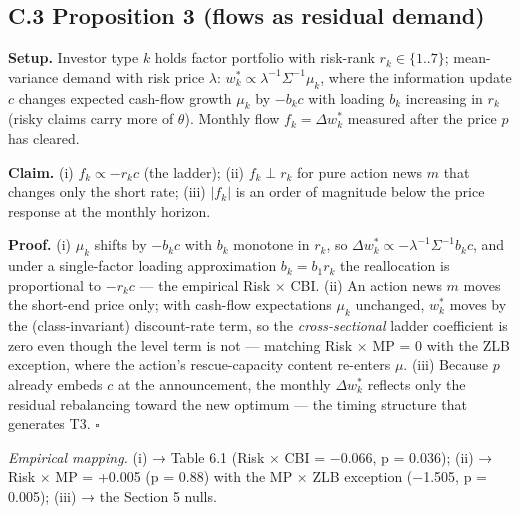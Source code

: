 \subsection{C.3 Proposition 3 (flows as residual demand)}\label{c.3-proposition-3-flows-as-residual-demand}

\textbf{Setup.} Investor type \(k\) holds factor portfolio with risk-rank \(r_k \in \{1..7\}\); mean-variance demand with risk price \(\lambda\): \(w_k^* \propto \lambda^{-1} \Sigma^{-1} \mu_k\), where the information update \(c\) changes expected cash-flow growth \(\mu_k\) by \(-b_k c\) with loading \(b_k\) increasing in \(r_k\) (risky claims carry more of \(\theta\)). Monthly flow \(f_k = \Delta w_k^*\) measured after the price \(p\) has cleared.

\textbf{Claim.} (i) \(f_k \propto -r_k c\) (the ladder); (ii) \(f_k \perp r_k\) for pure action news \(m\) that changes only the short rate; (iii) \(|f_k|\) is an order of magnitude below the price response at the monthly horizon.

\textbf{Proof.} (i) \(\mu_k\) shifts by \(-b_k c\) with \(b_k\) monotone in \(r_k\), so \(\Delta w_k^* \propto -\lambda^{-1} \Sigma^{-1} b_k c\), and under a single-factor loading approximation \(b_k = b_1 r_k\) the reallocation is proportional to \(-r_k c\) --- the empirical Risk × CBI. (ii) An action news \(m\) moves the short-end price only; with cash-flow expectations \(\mu_k\) unchanged, \(w_k^*\) moves by the (class-invariant) discount-rate term, so the \emph{cross-sectional} ladder coefficient is zero even though the level term is not --- matching Risk × MP = 0 with the ZLB exception, where the action's rescue-capacity content re-enters \(\mu\). (iii) Because \(p\) already embeds \(c\) at the announcement, the monthly \(\Delta w_k^*\) reflects only the residual rebalancing toward the new optimum --- the timing structure that generates T3. \(\square\)

\emph{Empirical mapping.} (i) → Table 6.1 (Risk × CBI = −0.066, p = 0.036); (ii) → Risk × MP = +0.005 (p = 0.88) with the MP × ZLB exception (−1.505, p = 0.005); (iii) → the Section 5 nulls.
